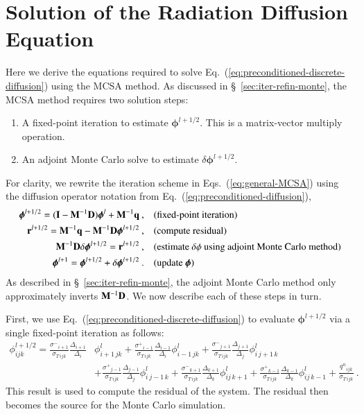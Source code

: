 \documentclass[preprint,12pt]{elsarticle}
\newcommand{\vr}{\ensuremath{\ve{r}}}
\newcommand{\vI}{\ensuremath{\ve{I}}}
\newcommand{\qn}{\ensuremath{q^n}}
\newcommand{\Di}{\ensuremath{\Delta_i}}
\newcommand{\Dj}{\ensuremath{\Delta_j}}
\newcommand{\Dk}{\ensuremath{\Delta_k}}
\newcommand{\sigT}{\ensuremath{\sigma_{T\,ijk}}}
\newcommand{\sigm}{\ensuremath{\sigma^{-}}}
\newcommand{\sigp}{\ensuremath{\sigma^{+}}}
\newcommand{\bphi}{\ensuremath{\boldsymbol{\phi}}}
\begin{document}
\section{Solution of the Radiation Diffusion Equation}
\label{sec:solut-radi-diff}

Here we derive the equations required to solve
Eq.~(\ref{eq:preconditioned-discrete-diffusion}) using the MCSA
method.  As discussed in \S~\ref{sec:iter-refin-monte}, the MCSA
method requires two solution steps:
\begin{enumerate}
\item A fixed-point iteration to estimate $\bphi^{l+1/2}$.  This is a
  matrix-vector multiply operation.
\item An adjoint Monte Carlo solve to estimate $\delta\bphi^{l+1/2}$.
\end{enumerate}
For clarity, we rewrite the iteration scheme in
Eqs.~(\ref{eq:general-MCSA}) using the diffusion operator notation
from Eq.~(\ref{eq:preconditioned-diffusion}),
\begin{align*}
  \bphi^{l+1/2} = (\vI - \ve{M}^{-1}\ve{D})\bphi^{l} +
  \ve{M}^{-1}\ve{q}\:, \quad & (\text{fixed-point iteration})\\
  \vr^{l+1/2} = \ve{M}^{-1}\ve{q} - \ve{M}^{-1}\ve{D}\bphi^{l+1/2}\:,
  \quad & (\text{compute residual})\\
  \ve{M}^{-1}\ve{D}\delta\bphi^{l+1/2} = \vr^{l+1/2}\:, \quad&
  (\text{estimate $\delta\phi$ using adjoint Monte Carlo method})\\
  \bphi^{l+1} = \bphi^{l+1/2} + \delta\bphi^{l+1/2}\:. \quad&
  (\text{update}\ \bphi)
\end{align*}
As described in \S~\ref{sec:iter-refin-monte}, the adjoint Monte Carlo
method only approximately inverts $\mathbf{M}^{-1}\mathbf{D}$.  We now
describe each of these steps in turn.

First, we use Eq.~(\ref{eq:preconditioned-discrete-diffusion}) to
evaluate $\bphi^{l+1/2}$ via a single fixed-point iteration as
follows:
\begin{equation}
  \begin{aligned}
    \phi_{ijk}^{l+1/2} =  
    \frac{\sigm_{i+1}}{\sigT}\frac{\Delta_{i+1}}{\Di}&\phi_{i+1\,jk}^l
    + \frac{\sigp_{i-1}}{\sigT}\frac{\Delta_{i-1}}{\Di}\phi_{i-1\,jk}^l
    +
    \frac{\sigm_{j+1}}{\sigT}\frac{\Delta_{j+1}}{\Dj}\phi_{i\,j+1\,k}^l \\ 
    &+ \frac{\sigp_{j-1}}{\sigT}\frac{\Delta_{j-1}}{\Dj}\phi_{i\,j-1\,k}^l 
    + \frac{\sigm_{k+1}}{\sigT}\frac{\Delta_{k+1}}{\Dk}\phi_{ij\,k+1}^l
    + \frac{\sigp_{k-1}}{\sigT}\frac{\Delta_{k-1}}{\Dk}\phi_{ij\,k-1}^l
    + \frac{\qn_{ijk}}{\sigT}\:.
  \end{aligned}
\end{equation}
This result is used to compute the residual of the system.  The
residual then becomes the source for the Monte Carlo simulation.
\end{document}
